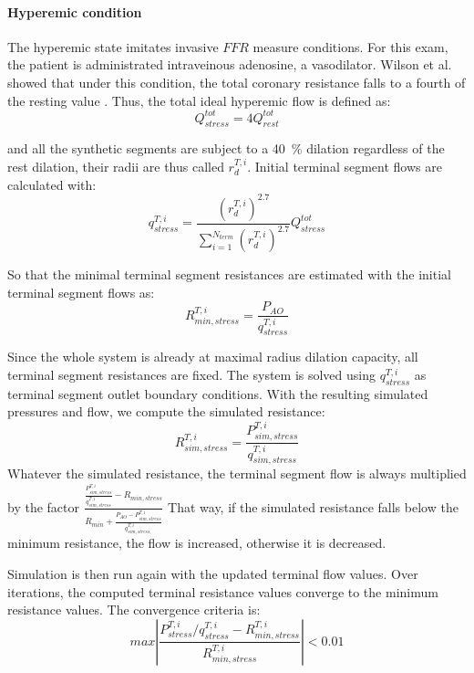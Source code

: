 \documentclass[journal]{IEEEtran}
\begin{document}
\paragraph{Hyperemic condition}
The hyperemic state imitates invasive $FFR$ measure conditions. For this exam, the patient is administrated intraveinous adenosine, a vasodilator. Wilson et al. showed that under this condition, the total coronary resistance falls to a fourth of the resting value \cite{wilson1990effects}. Thus, the total ideal hyperemic flow is defined as:
\begin{equation}
Q_{stress}^{tot} = 4 Q_{rest}^{tot}
\end{equation}

and all the synthetic segments are subject to a \SI{40}{\percent} dilation regardless of the rest dilation, their radii are thus called $r^{T,i}_d$.
Initial terminal segment flows are calculated with:
\begin{equation}
q^{T,i}_{stress} = \frac{(r^{T,i}_d)^{2.7}}{\sum\limits_{i=1}^{N_{term}} (r^{T,i}_d)^{2.7}}Q^{tot}_{stress}
\end{equation}

So that the minimal terminal segment resistances are estimated with the initial terminal segment flows as:
\begin{equation}
R^{T, i}_{min, stress} = \frac{P_{AO}}{q^{T,i}_{stress}}
\end{equation}

Since the whole system is already at maximal radius dilation capacity, all terminal segment resistances are fixed. The system is solved using $q^{T,i}_{stress}$ as terminal segment outlet boundary conditions.
With the resulting simulated pressures and flow, we compute the simulated resistance:
\begin{equation}
R^{T, i}_{sim, stress} = \frac{P^{T,i}_{sim,stress}}{q^{T,i}_{sim,stress}}
\end{equation}
Whatever the simulated resistance, the terminal segment flow is always multiplied by the factor $\frac{\frac{P^{T,i}_{sim, stress}}{q^{T,i}_{sim, stress}} - R_{min, stress}}{R_{min} + \frac{P_{AO} - P^{T,i}_{sim, stress}}{q^{T,i}_{sim, stress,}}}$ %
That way, if the simulated resistance falls below the minimum resistance, the flow is increased, otherwise it is decreased.

Simulation is then run again with the updated terminal flow values. Over iterations, the computed terminal resistance values converge to the minimum resistance values. The convergence criteria is:
\begin{equation}\label{eq:coron_conv_stress}
max \left\lvert \frac{P_{stress}^{T,i} / q_{stress}^{T,i}-R_{min,stress}^{T,i} }{R_{min, stress}^{T,i}} \right\rvert   < 0.01 
\end{equation}
\end{document}
